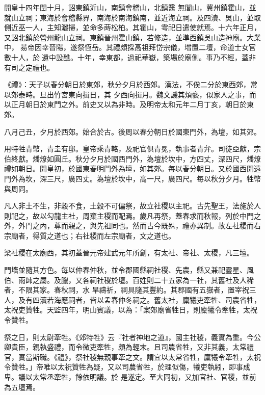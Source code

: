\begin{pinyinscope}
 開皇十四年閏十月，詔東鎮沂山，南鎮會稽山，北鎮醫
 無閭山，冀州鎮霍山，並就山立祠；東海於會稽縣界，南海於南海鎮南，並近海立祠。及四瀆、吳山，並取側近巫一人，主知灑掃，並命多蒔松柏。其霍山，雩祀日遣使就焉。十六年正月，又詔北鎮於營州龍山立祠。東鎮晉州霍山鎮，若修造，並準西鎮吳山造神廟。大業中，昜帝因幸晉陽，遂祭恆岳。其禮頗採高祖拜岱宗儀，增置二壇，命道士女官數十人，於遺中設醮。十年，幸東都，過祀華嶽，築場於廟側。事乃不經，蓋非有司之定禮也。



 《禮》：天子以春分朝日於東郊，秋分夕月於西郊。漢法，不俟二分於東西郊，常以郊泰畤。旦出竹宮東向揖日，其
 夕西向揖月。魏文譏其煩褻，似家人之事，而以正月朝日於東門之外。前史又以為非時。及明帝太和元年二月丁亥，朝日於東郊。



 八月己丑，夕月於西郊。始合於古。後周以春分朝日於國東門外，為壇，如其郊。



 用特牲青幣，青圭有邸。皇帝乘青輅，及祀官俱青冕，執事者青弁。司徒亞獻，宗伯終獻。燔燎如圓丘。秋分夕月於國西門外，為壇於坎中，方四丈，深四尺，燔燎禮如朝日。開皇初，於國東春明門外為壇，如其郊。每以春分朝日。又於國西開遠門外為坎，深三尺，廣四丈。為壇於坎中，高一尺，廣四尺。每以秋分夕月。牲幣與周同。



 凡人非土不生，非穀不食，土穀不可偏祭，故立社稷以主祀。古先聖王，法施於人則祀之，故以勾龍主社，周棄主稷而配焉。歲凡再祭，蓋春求而秋報，列於中門之外，外門之內，尊而親之，與先祖同也。然而古今既殊，禮亦異制。故左社稷而右宗廟者，得質之道也；右社稷而左宗廟者，文之道也。



 梁社稷在太廟西，其初蓋晉元帝建武元年所創，有太社、帝社、太稷，凡三壇。



 門墻並隨其方色。每以仲春仲秋，並令郡國縣祠社稷、先農，縣又兼祀靈星、風伯、雨師之屬。及臘，又各祠社稷於壇。百姓則二十五家為一社，其舊社及人稀者，不限其家。春秋祠，水
 旱禱祈，祠具隨其豐約。其郡國有五嶽者，置宰祝三人，及有四瀆若海應祠者，皆以孟春仲冬祠之。舊太社，廩犧吏牽牲、司農省牲，太祝吏贊牲。天監四年，明山賓議，以為：「案郊廟省牲日，則廩犧令牽牲，太祝令贊牲。



 祭之日，則太尉牽牲。《郊特牲》云『社者神地之道』，國主社稷，義實為重。今公卿貴臣，親執盛禮，而令微吏牽牲，頗為輕末。且司農省牲，又非其義，太常禮官，實當斯職。《禮》，祭社稷無親事牽之文。謂宜以太常省牲，廩犧令牽牲，太祝令贊牲。」帝唯以太祝贊牲為疑，又以司農省牲，於理似傷，犧吏執紖，即事成卑。議以太常丞牽牲，餘依明議。於
 是遂定。至大同初，又加官社、官稷，並前為五壇焉。




\end{pinyinscope}
